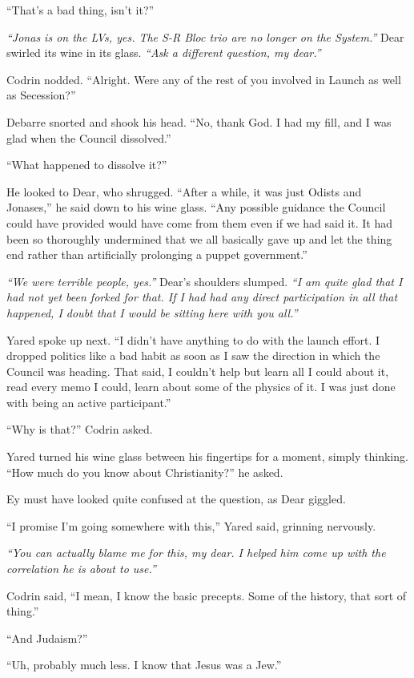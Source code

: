 ``That's a bad thing, isn't it?''

\emph{``Jonas is on the LVs, yes. The S-R Bloc trio are no longer on the System.''} Dear swirled its wine in its glass. \emph{``Ask a different question, my dear.''}

Codrin nodded. ``Alright. Were any of the rest of you involved in Launch as well as Secession?''

Debarre snorted and shook his head. ``No, thank God. I had my fill, and I was glad when the Council dissolved.''

``What happened to dissolve it?''

He looked to Dear, who shrugged. ``After a while, it was just Odists and Jonases,'' he said down to his wine glass. ``Any possible guidance the Council could have provided would have come from them even if we had said it. It had been so thoroughly undermined that we all basically gave up and let the thing end rather than artificially prolonging a puppet government.''

\emph{``We were terrible people, yes.''} Dear's shoulders slumped. \emph{``I am quite glad that I had not yet been forked for that. If I had had any direct participation in all that happened, I doubt that I would be sitting here with you all.''}

Yared spoke up next. ``I didn't have anything to do with the launch effort. I dropped politics like a bad habit as soon as I saw the direction in which the Council was heading. That said, I couldn't help but learn all I could about it, read every memo I could, learn about some of the physics of it. I was just done with being an active participant.''

``Why is that?'' Codrin asked.

Yared turned his wine glass between his fingertips for a moment, simply thinking. ``How much do you know about Christianity?'' he asked.

Ey must have looked quite confused at the question, as Dear giggled.

``I promise I'm going somewhere with this,'' Yared said, grinning nervously.

\emph{``You can actually blame me for this, my dear. I helped him come up with the correlation he is about to use.''}

Codrin said, ``I mean, I know the basic precepts. Some of the history, that sort of thing.''

``And Judaism?''

``Uh, probably much less. I know that Jesus was a Jew.''

